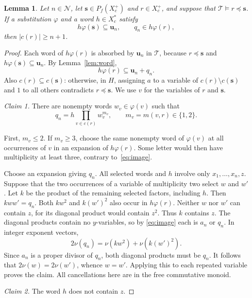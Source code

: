 \documentclass[11pt,reqno]{amsart}
\newtheorem{lemma}[theorem]{Lemma}
\theoremstyle{remark}
\newcommand{\T}{\mathcal T}
\newcommand{\Ncal}{\mathcal N}
\newcommand{\bu}{\mathbf u}
\newcommand{\bs}{\mathbf s}
\numberwithin{equation}{section}
\begin{document}
\begin{lemma}\label{lem:substitution}
Let $n\in\Ncal$, let $\bs\in P_f(X_c^+)$ and $r\in X_c^+$, and
suppose that $\T\models r\preceq\bs$. If a substitution $\varphi$ and
a word $h\in X_c^*$ satisfy
\begin{equation}\label{eq:hyp}
h\varphi(\bs)\subseteq\bu_n,\qquad q_n\in h\varphi(r),
\end{equation}
then $|c(r)|\geq n+1$.
\end{lemma}
\begin{proof}
Each word of $h\varphi(r)$ is absorbed by $\bu_n$ in $\T$, because
$r\preceq\bs$ and $h\varphi(\bs)\subseteq\bu_n$. By
Lemma~\ref{lem:word},
\begin{equation}\label{eq:image}
h\varphi(r)\subseteq\bu_n+q_n.
\end{equation}
Also $c(r)\subseteq c(\bs)$: otherwise, in $H$, assigning $a$ to a
variable of $c(r)\setminus c(\bs)$ and $1$ to all others contradicts
$r\preceq\bs$. We use $v$ for the variables of $r$ and $\bs$.

\emph{Claim 1.} There are nonempty words $w_v\in\varphi(v)$ such that
\begin{equation}\label{eq:factor}
q_n=h\prod_{v\in c(r)}w_v^{m_v},\qquad
m_v=m(v,r)\in\{1,2\}.
\end{equation}

First, $m_v\leq2$. If $m_v\geq3$, choose the same nonempty word of
$\varphi(v)$ at all occurrences of $v$ in an expansion of
$h\varphi(r)$. Some letter would then have multiplicity at least three,
contrary to~\eqref{eq:image}.

Choose an expansion giving $q_n$. All selected words and $h$ involve
only $x_1,\ldots,x_n,z$. Suppose that the two occurrences of a variable
of multiplicity two select $w$ and $w'$. Let $k$ be the product of the
remaining selected factors, including $h$. Then $kww'=q_n$. Both
$kw^2$ and $k(w')^2$ also occur in $h\varphi(r)$. Neither $w$ nor $w'$
can contain $z$, for its diagonal product would contain $z^2$. Thus $k$
contains $z$. The diagonal products contain no $y$-variables, so by
\eqref{eq:image} each is $a_n$ or $q_n$. In integer exponent vectors,
\[
2\nu(q_n)=\nu(kw^2)+\nu(k(w')^2).
\]
Since $a_n$ is a proper divisor of $q_n$, both diagonal products must
be $q_n$. It follows that $2\nu(w)=2\nu(w')$, whence $w=w'$.
Applying this to each repeated variable proves the claim. All cancellations
here are in the free commutative monoid.

\emph{Claim 2.} The word $h$ does not contain $z$.


\end{proof}
\end{document}
